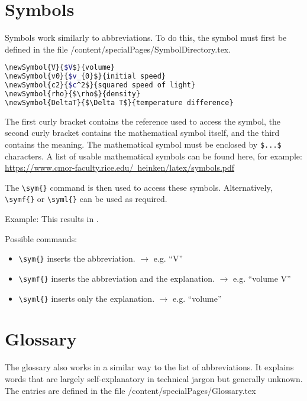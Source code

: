 \section{Symbols}
Symbols work similarly to abbreviations. To do this, the symbol must first be defined in the file /content/specialPages/SymbolDirectory.tex.

\begin{lstlisting}[caption=Example of a symbol definition, label=lst:symbol_def_en, language=bash]
\newSymbol{V}{$V$}{volume}
\newSymbol{v0}{$v_{0}$}{initial speed}
\newSymbol{c2}{$c^2$}{squared speed of light}
\newSymbol{rho}{$\rho$}{density}
\newSymbol{DeltaT}{$\Delta T$}{temperature difference}
\end{lstlisting}

The first curly bracket contains the reference used to access the symbol, the second curly bracket contains the mathematical symbol itself, and the third contains the meaning. The mathematical symbol must be enclosed by \texttt{\$...\$} characters. A list of usable mathematical symbols can be found here, for example: \href{https://www.cmor-faculty.rice.edu/~heinken/latex/symbols.pdf}{https://www.cmor-faculty.rice.edu/~heinken/latex/symbols.pdf}

The \texttt{\textbackslash{}sym\{\}} command is then used to access these symbols. Alternatively, \texttt{\textbackslash{}symf\{\}} or \texttt{\textbackslash{}syml\{\}} can be used as required.

Example: This results in .

Possible commands:
\begin{itemize}
    \item \texttt{\textbackslash{}sym\{\}} inserts the abbreviation. $\rightarrow$ e.g. \enquote{V}
    \item \texttt{\textbackslash{}symf\{\}} inserts the abbreviation and the explanation. $\rightarrow$ e.g. \enquote{volume V}
    \item \texttt{\textbackslash{}syml\{\}} inserts only the explanation. $\rightarrow$ e.g. \enquote{volume}
\end{itemize}


\section{Glossary}
The glossary also works in a similar way to the list of abbreviations. It explains words that are largely self-explanatory in technical jargon but generally unknown. The entries are defined in the file /content/specialPages/Glossary.tex

